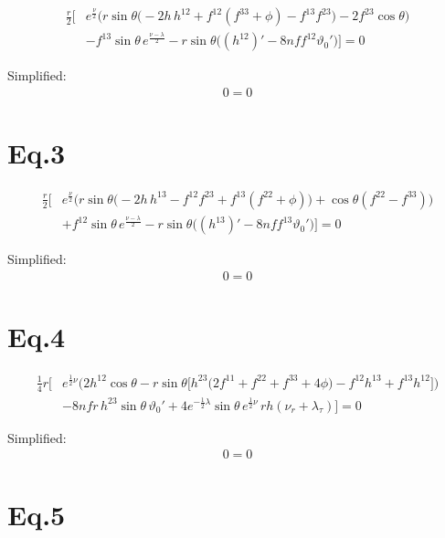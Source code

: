 \documentclass[12pt]{article}
\begin{document}
\begin{align*}
\frac{r}{2}\Big[
 & e^{\frac{\nu}{2}} \big(
   r \sin\theta \big(
     -2h\,h^{12}
     + f^{12}(f^{33} + \phi)
     - f^{13} f^{23}
   \big)
   - 2 f^{23} \cos\theta
 \big) \\
 &- f^{13} \sin\theta\, e^{\frac{\nu - \lambda}{2}}
 - r \sin\theta \big(
     (h^{12})' - 8nf f^{12} \vartheta_0'
   \big)
\Big] = 0
\end{align*}

Simplified:
\begin{align*}
0 = 0
\end{align*}

\section*{Eq.3}

\begin{align*}
\frac{r}{2}\Big[
 & e^{\frac{\nu}{2}} \big(
   r \sin\theta \big(
     -2h\,h^{13}
     - f^{12} f^{23}
     + f^{13}(f^{22} + \phi)
   \big)
   + \cos\theta (f^{22} - f^{33})
 \big) \\
 &+ f^{12} \sin\theta\, e^{\frac{\nu - \lambda}{2}}
 - r \sin\theta \big(
     (h^{13})' - 8nf f^{13} \vartheta_0'
   \big)
\Big] = 0
\end{align*}

Simplified:
\begin{align*}
  0 = 0
\end{align*}

\section*{Eq.4}

\begin{align*}
\frac{1}{4} r \Big[
 & e^{\frac{1}{2}\nu} \big(
   2h^{12}\cos\theta
   - r\sin\theta \big[
       h^{23}\big(2f^{11} + f^{22} + f^{33} + 4\phi\big)
       - f^{12}h^{13}
       + f^{13}h^{12}
     \big]
 \big) \\
 &- 8nf r\, h^{23} \sin\theta\, \vartheta_0'
 + 4 e^{-\frac{1}{2}\lambda} \sin\theta\, e^{\frac{1}{2}\nu}\, r h
   (\nu_r + \lambda_\tau)
\Big] = 0
\end{align*}

Simplified:
\begin{align*}
  0 = 0
\end{align*}

\section*{Eq.5}
\end{document}
